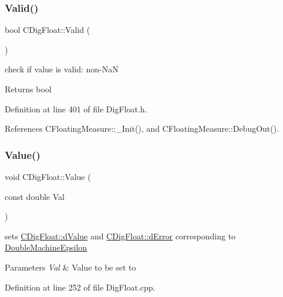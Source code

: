 \subsubsection{\texorpdfstring{Valid()}{Valid()}}
{\footnotesize\ttfamily bool C\+Dig\+Float\+::\+Valid (\begin{DoxyParamCaption}{ }\end{DoxyParamCaption})\hspace{0.3cm}{\ttfamily [inline]}}



check if value is valid\+: non-\/\+NaN 

\begin{DoxyReturn}{Returns}
bool 
\end{DoxyReturn}


Definition at line 401 of file Dig\+Float.\+h.



References C\+Floating\+Measure\+::\+\_\+\+Init(), and C\+Floating\+Measure\+::\+Debug\+Out().

\mbox{\label{classCDigFloat_af74b8cd0935294b6371f551b7a1ff640}} 
\subsubsection{\texorpdfstring{Value()}{Value()}\hspace{0.1cm}{\footnotesize\ttfamily [1/2]}}
{\footnotesize\ttfamily void C\+Dig\+Float\+::\+Value (\begin{DoxyParamCaption}\item[{const double}]{Val }\end{DoxyParamCaption})}



sets \hyperlink{classCDigFloat_a4bbe69e30dd4e20527362493aa9aaf96}{C\+Dig\+Float\+::d\+Value} and \hyperlink{classCDigFloat_a25eb3782d1e727ff007a48f8308e3d4d}{C\+Dig\+Float\+::d\+Error} corresponding to \hyperlink{Utils_8h_adb19ed17b4e8ed0a8525c35fdc8872c3}{Double\+Machine\+Epsilon} 


\begin{DoxyParams}{Parameters}
{\em Val} & Value to be set to \\
\hline
\end{DoxyParams}


Definition at line 252 of file Dig\+Float.\+cpp.



